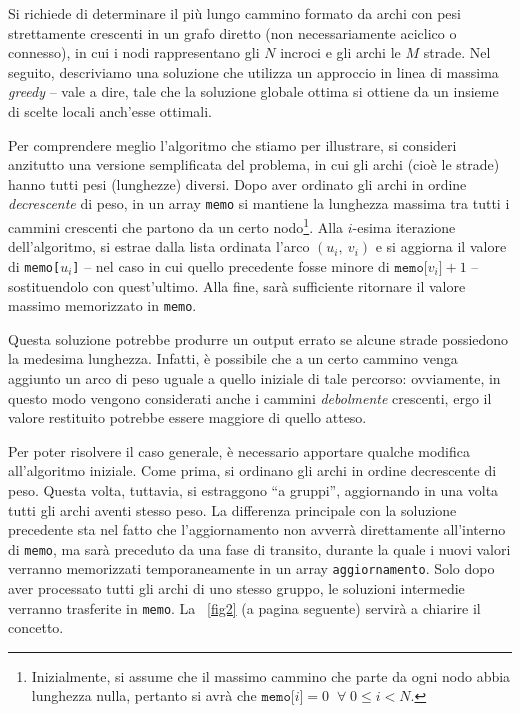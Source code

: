 
    
    Si richiede di determinare il più lungo cammino formato da archi con pesi strettamente crescenti in un grafo diretto (non necessariamente aciclico o connesso), in cui i nodi rappresentano gli $N$ incroci e gli archi le $M$ strade. Nel seguito, descriviamo una soluzione che utilizza un approccio in linea di massima \textit{greedy} -- vale a dire, tale che la soluzione globale ottima si ottiene da un insieme di scelte locali anch'esse ottimali.
    
    Per comprendere meglio l'algoritmo che stiamo per illustrare, si consideri anzitutto una versione semplificata del problema, in cui gli archi (cioè le strade) hanno tutti pesi (lunghezze) diversi. Dopo aver ordinato gli archi in ordine \textit{decrescente} di peso, in un array \texttt{memo} si mantiene la lunghezza massima tra tutti i cammini crescenti che partono da un certo nodo\footnote{Inizialmente, si assume che il massimo cammino che parte da ogni nodo abbia lunghezza nulla, pertanto si avrà che $\texttt{memo[$i$]} = 0 \; \; \forall \; 0 \le i < N$.}. Alla $i$-esima iterazione dell'algoritmo, si estrae dalla lista ordinata l'arco $(u_i, \: v_i)$ e si aggiorna il valore di \texttt{memo[$u_i$]} -- nel caso in cui quello precedente fosse minore di $\texttt{memo[$v_i$]} + 1$ -- sostituendolo con quest'ultimo. Alla fine, sarà sufficiente ritornare il valore massimo memorizzato in \texttt{memo}.
    
    Questa soluzione potrebbe produrre un output errato se alcune strade possiedono la medesima lunghezza. Infatti, è possibile che a un certo cammino venga aggiunto un arco di peso uguale a quello iniziale di tale percorso: ovviamente, in questo modo vengono considerati anche i cammini \textit{debolmente} crescenti, ergo il valore restituito potrebbe essere maggiore di quello atteso.
    
    Per poter risolvere il caso generale, è necessario apportare qualche modifica all'algoritmo iniziale. Come prima, si ordinano gli archi in ordine decrescente di peso. Questa volta, tuttavia, si estraggono ``a gruppi'', aggiornando in una volta tutti gli archi aventi stesso peso. La differenza principale con la soluzione precedente sta nel fatto che l'aggiornamento non avverrà direttamente all'interno di \texttt{memo}, ma sarà preceduto da una fase di transito, durante la quale i nuovi valori verranno memorizzati temporaneamente in un array \texttt{aggiornamento}. Solo dopo aver processato tutti gli archi di uno stesso gruppo, le soluzioni intermedie verranno trasferite in \texttt{memo}. La \figurename~\ref{fig2} (a pagina seguente) servirà a chiarire il concetto.
    
